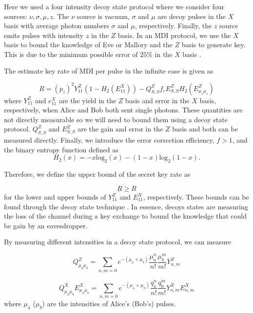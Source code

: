 Here we used a four intensity decoy state protocol where we consider four sources: $\nu, \sigma, \mu, z$. The $\nu$ source is vacuum, $\sigma$ and $\mu$ are decoy pulses in the $X$ basis with average photon numbers $\sigma$ and $\mu$, respectively. Finally, the $z$ source emits pulses with intensity $z$ in the $Z$ basis. In an \ac{MDI} protocol, we use the $X$ basis to bound the knowledge of Eve or Mallory and the $Z$ basis to generate key. This is due to the minimum possible error of $25\%$ in the $X$ basis \cite{Rubenok2013}.

The estimate key rate of \ac{MDI} per pulse in the infinite case is given as

\begin{equation}
	R = (p_z)^2 Y_{11}^Z \left(1 - H_2(E_{11}^X)\right) - Q_{S,S}^Z f_e E_{S,S}^Z H_2(E_{\mu_s\mu_s}^Z)
\end{equation}
where $Y_{11}^Z$ and $e_{11}^X$ are the yield in the $Z$ basis and error in the $X$ basis, respectively, when Alice and Bob both sent single photons. These quantities are not directly measurable so we will need to bound them using a decoy state protocol. $Q_{S,S}^Z$ and $E_{S,S}^Z$ are the gain and error in the $Z$ basis and both can be measured directly. Finally, we introduce the error correction efficiency, $f>1$, and the binary entropy function defined as
\begin{equation}
	H_2(x) = -x\mathrm{log}_2(x) - (1-x)\mathrm{log}_2(1-x).
\end{equation}

Therefore, we define the upper bound of the secret key rate as

\begin{equation}
	\underline{R} \geq R
\end{equation}
for the lower and upper bounds of $Y_{11}^Z$ and $E_{11}^X$, respectively. These bounds can be found through the decoy state technique \cite{Lo2005}. In essence, decoys states are measuring the loss of the channel during a key exchange to bound the knowledge that could be gain by an eavesdropper. 

By measuring different intensities in a decoy state protocol, we can measure

\begin{equation}
	Q_{\mu_a \mu_b}^Z = \sum_{n,m=0} e^{-(\mu_a + \mu_b)}\frac{\mu_a^n}{n!}\frac{\mu_b^m}{m!} Y_{n,m}^Z
\end{equation}

\begin{equation}
	Q_{\mu_{a} \mu_{b}}^X E^{X}_{\mu_{a} \mu_{b}}=\sum_{n, m=0} e^{-\left(\mu_{\mathrm{a}}+\mu_{\mathrm{b}}\right)} \frac{q_{\mathrm{a}}^{n}}{n !} \frac{q_{\mathrm{b}}^{m}}{m !} Y^{X}_{n, m} E^{X}_{n, m}
\end{equation}
where $\mu_a$ ($\mu_b$) are the intensities of Alice's (Bob's) pulses.

